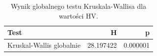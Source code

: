 \begin{table}
\caption{Wynik globalnego testu Kruskala-Wallisa dla wartości HV.}
\label{tab:kruskal_global}
\begin{tabular}{lrr}
\toprule
Test & H & p \\
\midrule
Kruskal-Wallis globalnie & 28.197422 & 0.000001 \\
\bottomrule
\end{tabular}
\end{table}

